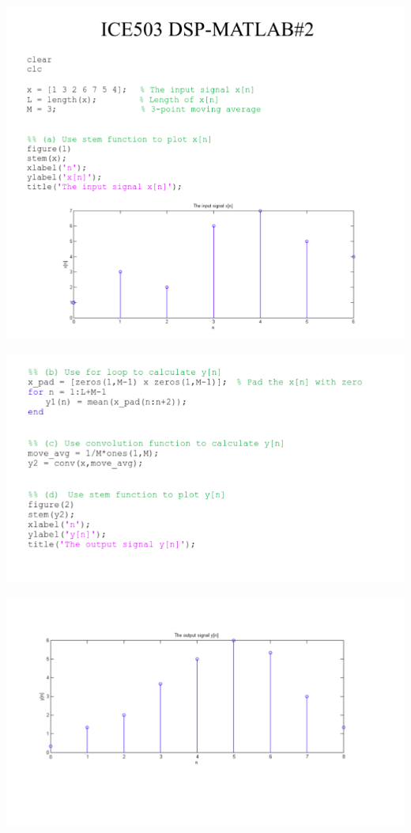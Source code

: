 \documentclass[a4paper]{article}
\begin{document}
	
	\begin{center}
		\includegraphics[width=1\linewidth]{screenshot017}
	\end{center}
	
	\begin{center}
		\includegraphics[width=1\linewidth]{screenshot018}
	\end{center}
	
	\begin{center}
		\includegraphics[width=1\linewidth]{screenshot019}
	\end{center}
	
\end{document}
